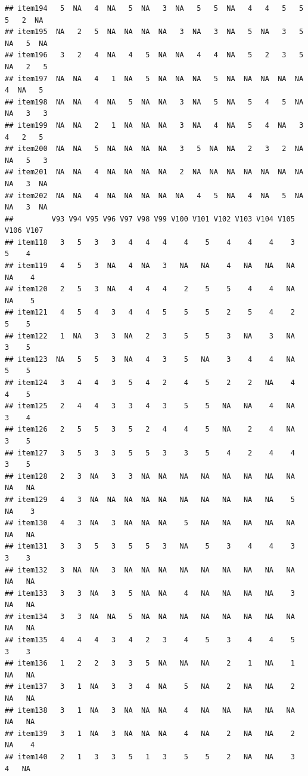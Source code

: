 \documentclass[
  man]{apa6}
\begin{document}
\begin{verbatim}
## item194   5  NA   4  NA   5  NA   3  NA   5   5  NA   4   4   5   5   5   2  NA
## item195  NA   2   5  NA  NA  NA  NA   3  NA   3  NA   5  NA   3   5  NA   5  NA
## item196   3   2   4  NA   4   5  NA  NA   4   4  NA   5   2   3   5  NA   2   5
## item197  NA  NA   4   1  NA   5  NA  NA  NA   5  NA  NA  NA  NA  NA   4  NA   5
## item198  NA  NA   4  NA   5  NA  NA   3  NA   5  NA   5   4   5  NA  NA   3   3
## item199  NA  NA   2   1  NA  NA  NA   3  NA   4  NA   5   4  NA   3   4   2   5
## item200  NA  NA   5  NA  NA  NA  NA   3   5  NA  NA   2   3   2  NA  NA   5   3
## item201  NA  NA   4  NA  NA  NA  NA   2  NA  NA  NA  NA  NA  NA  NA  NA   3  NA
## item202  NA  NA   4  NA  NA  NA  NA  NA   4   5  NA   4  NA   5  NA  NA   3  NA
##         V93 V94 V95 V96 V97 V98 V99 V100 V101 V102 V103 V104 V105 V106 V107
## item118   3   5   3   3   4   4   4    4    5    4    4    4    3    5    4
## item119   4   5   3  NA   4  NA   3   NA   NA    4   NA   NA   NA   NA    4
## item120   2   5   3  NA   4   4   4    2    5    5    4    4   NA   NA    5
## item121   4   5   4   3   4   4   5    5    5    2    5    4    2    5    5
## item122   1  NA   3   3  NA   2   3    5    5    3   NA    3   NA    3    5
## item123  NA   5   5   3  NA   4   3    5   NA    3    4    4   NA    5    5
## item124   3   4   4   3   5   4   2    4    5    2    2   NA    4    4    5
## item125   2   4   4   3   3   4   3    5    5   NA   NA    4   NA    3    4
## item126   2   5   5   3   5   2   4    4    5   NA    2    4   NA    3    5
## item127   3   5   3   3   5   5   3    3    5    4    2    4    4    3    5
## item128   2   3  NA   3   3  NA  NA   NA   NA   NA   NA   NA   NA   NA   NA
## item129   4   3  NA  NA  NA  NA  NA   NA   NA   NA   NA   NA    5   NA    3
## item130   4   3  NA   3  NA  NA  NA    5   NA   NA   NA   NA   NA   NA   NA
## item131   3   3   5   3   5   5   3   NA    5    3    4    4    3    3    3
## item132   3  NA  NA   3  NA  NA  NA   NA   NA   NA   NA   NA   NA   NA   NA
## item133   3   3  NA   3   5  NA  NA    4   NA   NA   NA   NA    3   NA   NA
## item134   3   3  NA  NA   5  NA  NA   NA   NA   NA   NA   NA   NA   NA   NA
## item135   4   4   4   3   4   2   3    4    5    3    4    4    5    3    3
## item136   1   2   2   3   3   5  NA   NA   NA    2    1   NA    1   NA   NA
## item137   3   1  NA   3   3   4  NA    5   NA    2   NA   NA    2   NA   NA
## item138   3   1  NA   3  NA  NA  NA    4   NA   NA   NA   NA   NA   NA   NA
## item139   3   1  NA   3  NA  NA  NA    4   NA    2   NA   NA    2   NA    4
## item140   2   1   3   3   5   1   3    5    5    2   NA   NA    3    4   NA

\end{verbatim}
\end{document}

